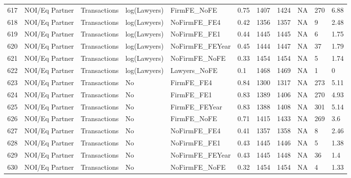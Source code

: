 \documentclass{article}
\begin{document}
\begin{table}[H]
\begin{tabular}{rllllllllll}
  617 & NOI/Eq Partner & Transactions & log(Lawyers) & FirmFE\_NoFE & 0.75 & 1407 & 1424 & NA & 270 & 6.88 \\ 
  618 & NOI/Eq Partner & Transactions & log(Lawyers) & NoFirmFE\_FE4 & 0.42 & 1356 & 1357 & NA & 9 & 2.48 \\ 
  619 & NOI/Eq Partner & Transactions & log(Lawyers) & NoFirmFE\_FE1 & 0.44 & 1445 & 1445 & NA & 6 & 1.75 \\ 
  620 & NOI/Eq Partner & Transactions & log(Lawyers) & NoFirmFE\_FEYear & 0.45 & 1444 & 1447 & NA & 37 & 1.79 \\ 
  621 & NOI/Eq Partner & Transactions & log(Lawyers) & NoFirmFE\_NoFE & 0.33 & 1454 & 1454 & NA & 5 & 1.74 \\ 
  622 & NOI/Eq Partner & Transactions & log(Lawyers) & Lawyers\_NoFE & 0.1 & 1468 & 1469 & NA & 1 & 0 \\ 
  623 & NOI/Eq Partner & Transactions & No & FirmFE\_FE4 & 0.84 & 1300 & 1317 & NA & 273 & 5.11 \\ 
  624 & NOI/Eq Partner & Transactions & No & FirmFE\_FE1 & 0.83 & 1389 & 1406 & NA & 270 & 4.93 \\ 
  625 & NOI/Eq Partner & Transactions & No & FirmFE\_FEYear & 0.83 & 1388 & 1408 & NA & 301 & 5.14 \\ 
  626 & NOI/Eq Partner & Transactions & No & FirmFE\_NoFE & 0.71 & 1415 & 1433 & NA & 269 & 3.6 \\ 
  627 & NOI/Eq Partner & Transactions & No & NoFirmFE\_FE4 & 0.41 & 1357 & 1358 & NA & 8 & 2.46 \\ 
  628 & NOI/Eq Partner & Transactions & No & NoFirmFE\_FE1 & 0.43 & 1445 & 1446 & NA & 5 & 1.38 \\ 
  629 & NOI/Eq Partner & Transactions & No & NoFirmFE\_FEYear & 0.43 & 1445 & 1448 & NA & 36 & 1.4 \\ 
  630 & NOI/Eq Partner & Transactions & No & NoFirmFE\_NoFE & 0.32 & 1454 & 1454 & NA & 4 & 1.33 \\ 
   \hline
\end{tabular}
\end{table}
\end{document}
